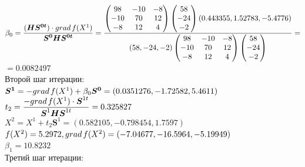 \documentclass[14pt,a4paper,fleqn]{extarticle}
\begin{document}
	\small $\beta_0 = \dfrac{(\boldsymbol{H}\boldsymbol{S^{0t}})\cdot grad\hspace*{0.05cm}f(X^1)}{\boldsymbol{S^{0}}\boldsymbol{H}\boldsymbol{S^{0t}}} = \dfrac{\begin{pmatrix} 98 & -10 & -8\\ -10 & 70 & 12\\ -8 & 12 & 4\\ \end{pmatrix}\begin{pmatrix} 58\\ -24\\ -2\\ \end{pmatrix}(0.443355, 1.52783, -5.4776)}{(58,-24,-2)\begin{pmatrix} 98 & -10 & -8\\ -10 & 70 & 12\\ -8 & 12 & 4\\ \end{pmatrix}\begin{pmatrix} 58\\ -24\\ -2\\ \end{pmatrix}} = $\\
	$= 0.0082497$\\
	
	\normalsize Второй шаг итерации:\\
	
	$\boldsymbol{S^{1}} = -grad\hspace*{0.05cm}f(X^1) + \beta_0\boldsymbol{S^{0}} = (0.0351276, -1.72582, 5.4611)$\\
	
	$t_2 = \dfrac{-grad\hspace*{0.05cm}f(X^1) \cdot \boldsymbol{S}^{1t}}{\boldsymbol{S}^1\boldsymbol{H}\boldsymbol{S}^{1t}} = 0.325827$\\
	
	\newpage
	$X^2 = X^1 + t_2\boldsymbol{S}^{1} = (0.582105, -0.798454, 1.7597)$\\
	
	$f(X^2) = 5.2972, grad\hspace*{0.05cm}f(X^2) = (-7.04677, -16.5964, -5.19949)$\\
	
	$\beta_1 = 10.8232$\\
	
	Третий шаг итерации:\\
	
\end{document}
